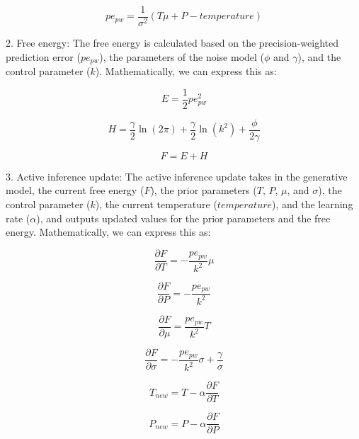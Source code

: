 \documentclass{article}
\begin{document}
\begin{equation}
pe_{pw} = \frac{1}{\sigma^2}(T\mu + P - temperature)
\end{equation}

2. Free energy:
The free energy is calculated based on the precision-weighted prediction error ($pe_{pw}$), the parameters of the noise model ($\phi$ and $\gamma$), and the control parameter ($k$). Mathematically, we can express this as:

\begin{equation}
E = \frac{1}{2}pe_{pw}^2
\end{equation}

\begin{equation}
H = \frac{\gamma}{2}\ln(2\pi) + \frac{\gamma}{2}\ln(k^2) + \frac{\phi}{2\gamma}
\end{equation}

\begin{equation}
F = E + H
\end{equation}

3. Active inference update:
The active inference update takes in the generative model, the current free energy ($F$), the prior parameters ($T$, $P$, $\mu$, and $\sigma$), the control parameter ($k$), the current temperature ($temperature$), and the learning rate ($\alpha$), and outputs updated values for the prior parameters and the free energy. Mathematically, we can express this as:

\begin{equation}
\frac{\partial F}{\partial T} = -\frac{pe_{pw}}{k^2}\mu
\end{equation}

\begin{equation}
\frac{\partial F}{\partial P} = -\frac{pe_{pw}}{k^2}
\end{equation}

\begin{equation}
\frac{\partial F}{\partial \mu} = \frac{pe_{pw}}{k^2}T
\end{equation}

\begin{equation}
\frac{\partial F}{\partial \sigma} = -\frac{pe_{pw}}{k^2}\sigma + \frac{\gamma}{\sigma}
\end{equation}

\begin{equation}
T_{new} = T - \alpha\frac{\partial F}{\partial T}
\end{equation}

\begin{equation}
P_{new} = P - \alpha\frac{\partial F}{\partial P}
\end{equation}
\end{document}
